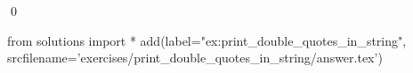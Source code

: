 
\begin{ex} 
  \label{ex:print_double_quotes_in_string}
  
  \qed
\end{ex} 
\begin{python0}
from solutions import *
add(label="ex:print_double_quotes_in_string",
    srcfilename='exercises/print_double_quotes_in_string/answer.tex') 
\end{python0}

